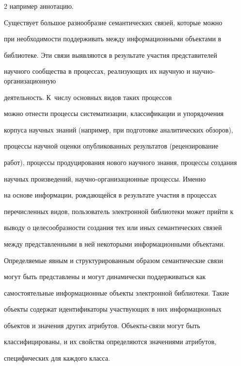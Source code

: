 \begin{multicols}{2}
например аннотацию. 


     


     Существует большое разнообразие семантических связей, которые можно 


при необходимости поддерживать между информационными объектами в 


библиотеке. Эти связи выявляются в результате участия представителей 


научного сообщества в процессах, реализующих их научную и на\-уч\-но-ор\-га\-ни\-за\-ци\-он\-ную 


деятельность. К~чис\-лу основных видов таких процессов 


можно отнести процессы систематизации, классификации и упорядочения 


корпуса научных знаний (например, при подготовке аналитических обзоров), 


процессы научной оценки опубликованных результатов (рецензирование 


работ), процессы продуцирования нового научного знания, процессы создания 


научных произведений, на\-уч\-но-ор\-га\-ни\-за\-ци\-он\-ные процессы. Именно 


на основе информации, рождающейся в результате учас\-тия в процессах 


перечисленных видов, пользователь электронной библиотеки может прийти к 


выводу о целесообразности создания тех или иных семантических связей 


между представленными в ней некоторыми информационными объектами.


     


     Определяемые явным и структурированным образом семантические связи 


могут быть представлены и могут динамически поддерживаться как 


самостоятельные информационные объекты электронной библиотеки. Такие 


объекты содержат идентификаторы участвующих в них информационных 


объектов и значения других атрибутов. Объек\-ты-свя\-зи могут быть 


классифицированы, и их свойства определяются значениями атрибутов, 


специфических для каждого класса. 



\end{multicols}
